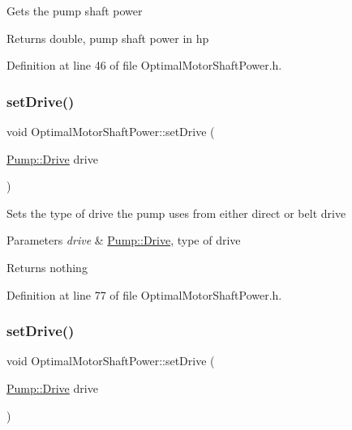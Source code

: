 Gets the pump shaft power

\begin{DoxyReturn}{Returns}
double, pump shaft power in hp 
\end{DoxyReturn}


Definition at line 46 of file Optimal\+Motor\+Shaft\+Power.\+h.

\mbox{\label{class_optimal_motor_shaft_power_abd88cbdcba70dbb194a8f957b4467fc7}} 
\subsubsection{\texorpdfstring{set\+Drive()}{setDrive()}\hspace{0.1cm}{\footnotesize\ttfamily [1/3]}}
{\footnotesize\ttfamily void Optimal\+Motor\+Shaft\+Power\+::set\+Drive (\begin{DoxyParamCaption}\item[{\hyperlink{class_pump_a32bf0ade131a11bb3b3fb374f638e983}{Pump\+::\+Drive}}]{drive }\end{DoxyParamCaption})\hspace{0.3cm}{\ttfamily [inline]}}

Sets the type of drive the pump uses from either direct or belt drive


\begin{DoxyParams}{Parameters}
{\em drive} & \hyperlink{class_pump_a32bf0ade131a11bb3b3fb374f638e983}{Pump\+::\+Drive}, type of drive\\
\hline
\end{DoxyParams}
\begin{DoxyReturn}{Returns}
nothing 
\end{DoxyReturn}


Definition at line 77 of file Optimal\+Motor\+Shaft\+Power.\+h.

\mbox{\label{class_optimal_motor_shaft_power_abd88cbdcba70dbb194a8f957b4467fc7}} 
\subsubsection{\texorpdfstring{set\+Drive()}{setDrive()}\hspace{0.1cm}{\footnotesize\ttfamily [2/3]}}
{\footnotesize\ttfamily void Optimal\+Motor\+Shaft\+Power\+::set\+Drive (\begin{DoxyParamCaption}\item[{\hyperlink{class_pump_a32bf0ade131a11bb3b3fb374f638e983}{Pump\+::\+Drive}}]{drive }\end{DoxyParamCaption})\hspace{0.3cm}{\ttfamily [inline]}}

